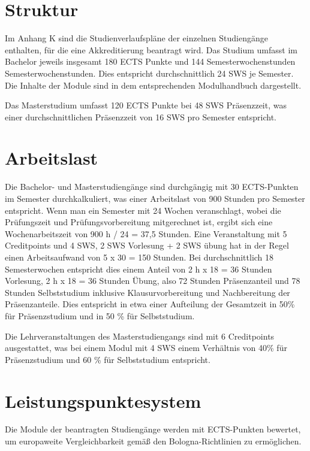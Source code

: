 \section{Struktur}\label{struktur}

Im Anhang K sind die Studienverlaufspläne der einzelnen Studiengänge
enthalten, für die eine Akkreditierung beantragt wird. Das Studium
umfasst im Bachelor jeweils insgesamt 180 ECTS Punkte und 144
Semesterwochenstunden Semesterwochenstunden. Dies entspricht
durchschnittlich 24 SWS je Semester. Die Inhalte der Module sind in dem
entsprechenden Modulhandbuch dargestellt.

Das Masterstudium umfasst 120 ECTS Punkte bei 48 SWS Präsenzzeit, was
einer durchschnittlichen Präsenzzeit von 16 SWS pro Semester entspricht.

\section{Arbeitslast}\label{arbeitslast}

Die Bachelor- und Masterstudiengänge sind durchgängig mit 30
ECTS-Punkten im Semester durchkalkuliert, was einer Arbeitslast von 900
Stunden pro Semester entspricht. Wenn man ein Semester mit 24 Wochen
veranschlagt, wobei die Prüfungszeit und Prüfungsvorbereitung
mitgerechnet ist, ergibt sich eine Wochenarbeitszeit von 900 h / 24 =
37,5 Stunden. Eine Veranstaltung mit 5 Creditpoints und 4 SWS, 2 SWS
Vorlesung + 2 SWS übung hat in der Regel einen Arbeitsaufwand von 5 x 30
= 150 Stunden. Bei durchschnittlich 18 Semesterwochen entspricht dies
einem Anteil von 2 h x 18 = 36 Stunden Vorlesung, 2 h x 18 = 36 Stunden
Übung, also 72 Stunden Präsenzanteil und 78 Stunden Selbststudium
inklusive Klausurvorbereitung und Nachbereitung der Präsenzanteile. Dies
entspricht in etwa einer Aufteilung der Gesamtzeit in 50\% für
Präsenzstudium und in 50 \% für Selbststudium.

Die Lehrveranstaltungen des Masterstudiengangs sind mit 6 Creditpoints
ausgestattet, was bei einem Modul mit 4 SWS einem Verhältnis von 40\%
für Präsenzstudium und 60 \% für Selbststudium entspricht.

\section{Leistungspunktesystem}\label{leistungspunktesystem}

Die Module der beantragten Studiengänge werden mit ECTS-Punkten
bewertet, um europaweite Vergleichbarkeit gemäß den Bologna-Richtlinien
zu ermöglichen.

